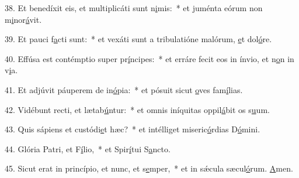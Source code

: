 38. Et benedíxit eis, et multiplicáti sunt n\uline{i}mis:~* et juménta eórum non m\uline{i}nor\uline{á}vit.\par 
39. Et pauci f\uline{a}cti sunt:~* et vexáti sunt a tribulatióne malórum, \uline{e}t dol\uline{ó}re.\par 
40. Effúsa est contémptio super pr\uline{í}ncipes:~* et erráre fecit eos in ínvio, et n\uline{o}n in v\uline{i}a.\par 
41. Et adjúvit páuperem de in\uline{ó}pia:~* et pósuit sicut \uline{o}ves fam\uline{í}lias.\par 
42. Vidébunt recti, et lætab\uline{ú}ntur:~* et omnis iníquitas oppil\uline{á}bit os s\uline{u}um.\par 
43. Quis sápiens et custódi\uline{e}t hæc?~* et intélliget miseric\uline{ó}rdias D\uline{ó}mini.\par 
44. Glória Patri, et F\uline{í}lio,~* et Spir\uline{í}tui S\uline{a}ncto.\par 
45. Sicut erat in princípio, et nunc, et s\uline{e}mper,~* et in sǽcula sæcul\uline{ó}rum. \uline{A}men.\par 
